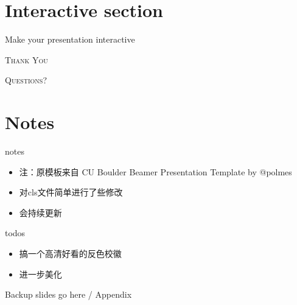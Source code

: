 \documentclass{cubeamer}
\begin{document}
\section{Interactive section}

\begin{frame}{Make your presentation interactive}
    \begin{cublock}
        \begin{overlayarea}{\textwidth}{\baselineskip}
        \end{overlayarea}
    \end{cublock}
\end{frame}

\begin{frame}[standout]
    \Huge\textsc{Thank You }
    
    \vfill
    
    \LARGE\textsc{Questions?}
\end{frame}

\section{Notes}
\begin{frame}{notes}
\begin{itemize}
\item 注：原模板来自 CU Boulder Beamer Presentation Template by @polmes
\item 对cls文件简单进行了些修改
\item 会持续更新
\end{itemize}
\end{frame}

\begin{frame}{todos}
\begin{itemize}
\item 搞一个高清好看的反色校徽
\item 进一步美化
\end{itemize}
\end{frame}
\appendix

\begin{frame}{Backup slides go here / Appendix}

    
\end{frame}
\end{document}
